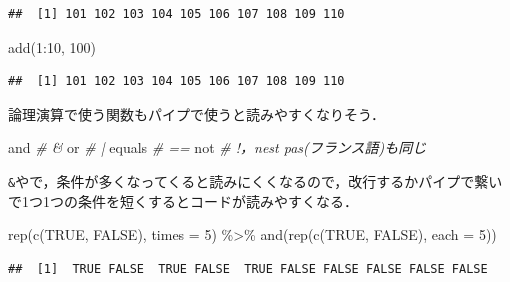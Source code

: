 \documentclass[
]{article}
\newenvironment{Shaded}{\begin{snugshade}}{\end{snugshade}}
\newcommand{\AttributeTok}[1]{\textcolor[rgb]{0.77,0.63,0.00}{#1}}
\newcommand{\CommentTok}[1]{\textcolor[rgb]{0.56,0.35,0.01}{\textit{#1}}}
\newcommand{\ConstantTok}[1]{\textcolor[rgb]{0.00,0.00,0.00}{#1}}
\newcommand{\DecValTok}[1]{\textcolor[rgb]{0.00,0.00,0.81}{#1}}
\newcommand{\FunctionTok}[1]{\textcolor[rgb]{0.00,0.00,0.00}{#1}}
\newcommand{\NormalTok}[1]{#1}
\newcommand{\SpecialCharTok}[1]{\textcolor[rgb]{0.00,0.00,0.00}{#1}}
\begin{document}
\begin{verbatim}
##  [1] 101 102 103 104 105 106 107 108 109 110
\end{verbatim}

\begin{Shaded}
\begin{Highlighting}[]
\FunctionTok{add}\NormalTok{(}\DecValTok{1}\SpecialCharTok{:}\DecValTok{10}\NormalTok{, }\DecValTok{100}\NormalTok{)}
\end{Highlighting}
\end{Shaded}

\begin{verbatim}
##  [1] 101 102 103 104 105 106 107 108 109 110
\end{verbatim}

論理演算で使う関数もパイプで使うと読みやすくなりそう．

\begin{Shaded}
\begin{Highlighting}[]
\NormalTok{and          }\CommentTok{\# \textasciigrave{}\&\textasciigrave{}}
\NormalTok{or           }\CommentTok{\# \textasciigrave{}|\textasciigrave{}}
\NormalTok{equals       }\CommentTok{\# \textasciigrave{}==\textasciigrave{}}
\NormalTok{not          }\CommentTok{\# \textasciigrave{}!\textasciigrave{}，\textasciigrave{}n\textquotesingle{}est pas\textasciigrave{}(フランス語)も同じ}
\end{Highlighting}
\end{Shaded}

\texttt{\&}や\texttt{\textbar{}}で，条件が多くなってくると読みにくくなるので，改行するかパイプで繋いで1つ1つの条件を短くするとコードが読みやすくなる．

\begin{Shaded}
\begin{Highlighting}[]
\FunctionTok{rep}\NormalTok{(}\FunctionTok{c}\NormalTok{(}\ConstantTok{TRUE}\NormalTok{, }\ConstantTok{FALSE}\NormalTok{), }\AttributeTok{times =} \DecValTok{5}\NormalTok{) }\SpecialCharTok{\%\textgreater{}\%}
  \FunctionTok{and}\NormalTok{(}\FunctionTok{rep}\NormalTok{(}\FunctionTok{c}\NormalTok{(}\ConstantTok{TRUE}\NormalTok{, }\ConstantTok{FALSE}\NormalTok{), }\AttributeTok{each =} \DecValTok{5}\NormalTok{))}
\end{Highlighting}
\end{Shaded}

\begin{verbatim}
##  [1]  TRUE FALSE  TRUE FALSE  TRUE FALSE FALSE FALSE FALSE FALSE
\end{verbatim}
\end{document}
